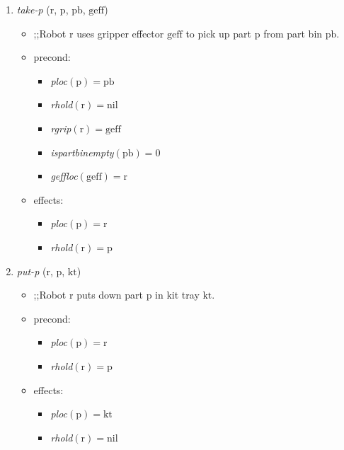 \begin{small}
\begin{enumerate}
\item \textsl{take-p} ($\mathrm{r}$, $\mathrm{p}$, $\mathrm{pb}$, $\mathrm{geff}$)
\begin{itemize}
\item ;;Robot $\mathrm{r}$ uses gripper effector $\mathrm{geff}$ to pick up part $\mathrm{p}$ from part bin $\mathrm{pb}$.
\item precond:
\begin{itemize}
\item[]\emph{ploc}$\mathrm{(p)=pb}$
\item[]\emph{rhold}$\mathrm{(r)=nil}$
\item[]\emph{rgrip}$\mathrm{(r)=geff}$
\item[]\emph{ispartbinempty}$\mathrm{(pb)=0}$
\item[]\emph{geffloc}$\mathrm{(geff)=r}$

\end{itemize}
\item effects:
\begin{itemize}
\item[]\emph{ploc}$\mathrm{(p)=r}$
\item[]\emph{rhold}$\mathrm{(r)=p}$
\end{itemize}
\end{itemize}

\item \textsl{put-p} ($\mathrm{r}$, $\mathrm{p}$, $\mathrm{kt}$)
\begin{itemize}
\item ;;Robot $\mathrm{r}$ puts down part $\mathrm{p}$ in kit tray $\mathrm{kt}$.
\item precond:
\begin{itemize}
\item[]\emph{ploc}$\mathrm{(p)=r}$
\item[]\emph{rhold}$\mathrm{(r)=p}$
\end{itemize}
\item effects:
\begin{itemize}
\item[]\emph{ploc}$\mathrm{(p)=kt}$
\item[]\emph{rhold}$\mathrm{(r)=nil}$
\end{itemize}
\end{itemize}


\end{enumerate}
\end{small}

